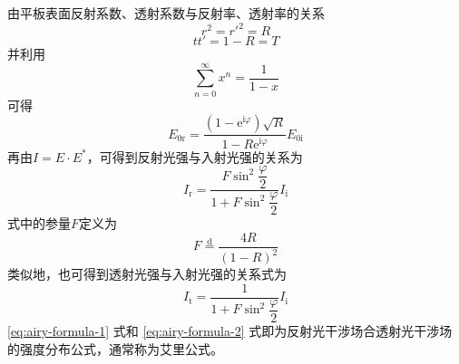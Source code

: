 \documentclass[cn,10pt,chinesefont=founder,math=mtpro2,cite=super,toc=onecol,twoside,openany]{elegantbook}
\begin{document}
由平板表面反射系数、透射系数与反射率、透射率的关系
\begin{equation}
r^2=r'^2=R
\end{equation}
\begin{equation}
tt'=1-R=T
\end{equation}
并利用
\begin{equation}
\sum_{n=0}^{\infty}x^n=\frac{1}{1-x}
\end{equation}
可得
\begin{equation}
E_{0\mathrm{r}}=\frac{(1-\mathrm{e}^{\mathrm{i}\varphi})\sqrt{R}}{1-R\mathrm{e}^{\mathrm{i}\varphi}}E_{0\mathrm{i}}
\end{equation}
再由$I=E\cdot E^*$，可得到反射光强与入射光强的关系为
\begin{equation}
I_{\mathrm{r}}=\frac{F\sin^2\dfrac{\varphi}{2}}{1+F\sin^2\dfrac{\varphi}{2}}I_{\mathrm{i}}
\label{eq:airy-formula-1}
\end{equation}
式中的参量$F$定义为
\begin{equation}
F\overset{\text{d}}{=}\frac{4R}{(1-R)^2}
\end{equation}
类似地，也可得到透射光强与入射光强的关系式为
\begin{equation}
I_{\mathrm{t}}=\frac{1}{1+F\sin^2\dfrac{\varphi}{2}}I_{\mathrm{i}}
\label{eq:airy-formula-2}
\end{equation}
\eqref{eq:airy-formula-1} 式和 \eqref{eq:airy-formula-2} 式即为反射光干涉场合透射光干涉场的强度分布公式，通常称为艾里公式。
\end{document}

